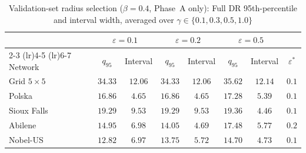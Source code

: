 \begin{table}[htbp]
\centering
\caption{Validation-set radius selection ($\beta=0.4$, Phase~A only): Full DR 95th-percentile and interval width, averaged over $\gamma\in\{0.1,0.3,0.5,1.0\}$}
\label{tab:eps-selection}
\small
\setlength{\tabcolsep}{5pt}
\begin{tabular}{l cc cc cc c}
\toprule
& \multicolumn{2}{c}{$\varepsilon=0.1$} & \multicolumn{2}{c}{$\varepsilon=0.2$} & \multicolumn{2}{c}{$\varepsilon=0.5$} & \\
\cmidrule(lr){2-3} \cmidrule(lr){4-5} \cmidrule(lr){6-7}
Network & $q_{95}$ & Interval & $q_{95}$ & Interval & $q_{95}$ & Interval & $\varepsilon^{*}$ \\
\midrule
Grid $5 \times 5$ & $\mathbf{34.33}$ & $\mathbf{12.06}$ & $34.33$ & $12.06$ & $35.62$ & $12.14$ & $0.1$ \\
Polska & $\mathbf{16.86}$ & $\mathbf{4.65}$ & $16.86$ & $4.65$ & $17.28$ & $5.39$ & $0.1$ \\
Sioux Falls & $\mathbf{19.29}$ & $\mathbf{9.53}$ & $19.29$ & $9.53$ & $19.36$ & $4.46$ & $0.1$ \\
Abilene & $14.95$ & $6.98$ & $\mathbf{14.05}$ & $\mathbf{4.69}$ & $17.48$ & $5.77$ & $0.2$ \\
Nobel-US & $\mathbf{12.82}$ & $\mathbf{6.97}$ & $13.75$ & $5.72$ & $14.70$ & $4.73$ & $0.1$ \\
\bottomrule
\end{tabular}
\end{table}
